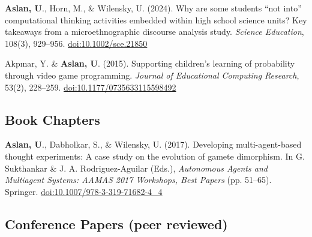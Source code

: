 \documentclass[11pt,letterpaper]{report} %
\begin{document}
    \begin{tablist}

        \item[2024] \tab{}\textbf{Aslan, U}., Horn, M., \& Wilensky, U. (2024). Why are some students \enquote{not into} computational thinking activities embedded within high school science units? Key takeaways from a microethnographic discourse analysis study. \textit{Science Education}, 108(3), 929--956. \href{https://doi.org/10.1002/sce.21850}{doi:10.1002/sce.21850}

        \item[2015] \tab{}Akpınar, Y. \& \textbf{Aslan, U}. (2015). Supporting children's learning of probability through video game programming. \textit{Journal of Educational Computing Research}, 53(2), 228--259. \href{https://doi.org/10.1177/0735633115598492}{doi:10.1177/0735633115598492}

    \end{tablist}



    \subsection*{Book Chapters}

    \begin{tablist}

        \item[2017] \tab{}\textbf{Aslan, U}., Dabholkar, S., \& Wilensky, U. (2017). Developing multi-agent-based thought experiments: A case study on the evolution of gamete dimorphism. In G. Sukthankar \& J. A. Rodriguez-Aguilar (Eds.), \textit{Autonomous Agents and Multiagent Systems: AAMAS 2017 Workshops, Best Papers} (pp. 51--65). Springer. \href{https://doi.org/10.1007/978-3-319-71682-4\_4}{doi:10.1007/978-3-319-71682-4\_4}

    \end{tablist}

    \subsection*{Conference Papers (peer reviewed)}
\end{document}
